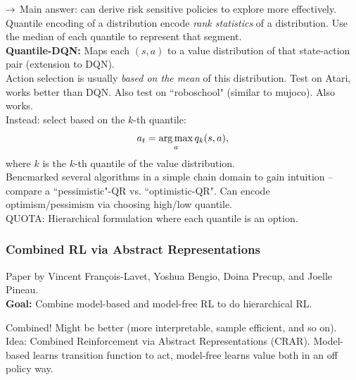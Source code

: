 $\rightarrow$ Main answer: can derive risk sensitive policies to explore more effectively. \\

Quantile encoding of a distribution encode {\it rank statistics} of a distribution. Use the median of each quantile to represent that segment. \\

{\bf Quantile-DQN:} Maps each $(s,a)$ to a value distribution of that state-action pair (extension to DQN). \\

Action selection is usually {\it based on the mean} of this distribution. Test on Atari, works better than DQN. Also test on ``roboschool" (similar to mujoco). Also works. \\



Instead: select based on the $k$-th quantile:
\[
a_t = \operatorname*{arg\,max}_a q_k(s,a),
\]
where $k$ is the $k$-th quantile of the value distribution. \\

Bencmarked several algorithms in a simple chain domain to gain intuition -- compare a ``pessimistic"-QR vs. ``optimistic-QR". Can encode optimism/pessimism via choosing high/low quantile. \\

QUOTA: Hierarchical formulation where each quantile is an option.

\subsubsection{Combined RL via Abstract Representations~\cite{franccois2018combined}}

Paper by Vincent Fran{\c{c}}ois-Lavet, Yoshua Bengio, Doina Precup, and Joelle Pineau.\\

{\bf Goal:} Combine model-based and model-free RL to do hierarchical RL. \\



Combined! Might be better (more interpretable, sample efficient, and so on). \\

Idea: Combined Reinforcement via Abstract Representations (CRAR). Model-based learns transition function to act, model-free learns value both in an off policy way. \\

